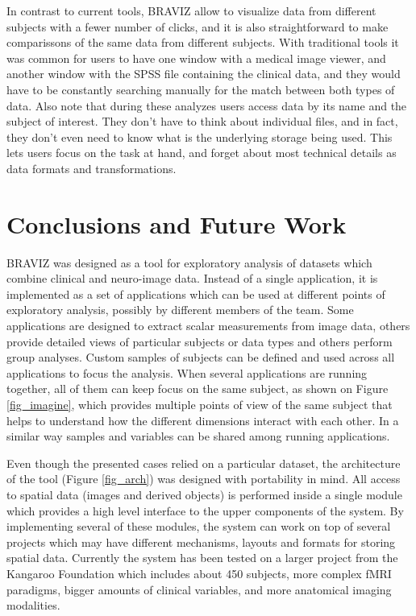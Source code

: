 \documentclass[twocolumn]{svjour3}
\begin{document}
In contrast to current tools, BRAVIZ allow to visualize data from different subjects with a fewer number of clicks, and it is also straightforward to make comparissons of the same data from different subjects. With traditional tools it was common for users to have one window with a medical image viewer, and another window with the SPSS file containing the clinical data, and they would have to be constantly searching manually for the match between both types of data. Also note that during these analyzes users access data by its name and the subject of interest. They don't have to think about individual files, and in fact, they don't even need to know what is the underlying storage being used. This lets users focus on the task at hand, and forget about most technical details as data formats and transformations. 

\section{Conclusions and Future Work}

BRAVIZ was designed as a tool for exploratory analysis of datasets which combine clinical and neuro-image data. Instead of a single application, it is implemented as a set of applications which can be used at different points of exploratory analysis, possibly by different members of the team. Some applications are designed to extract scalar measurements from image data, others provide detailed views of particular subjects or data types and others perform group analyses. Custom samples of subjects can be defined and used across all applications to focus the analysis. When several applications are running together, all of them can keep focus on the same subject, as shown on Figure \ref{fig_imagine}, which provides multiple points of view of the same subject that helps to understand how the different dimensions interact with each other. In a similar way samples and variables can be shared among running applications.

Even though the presented cases relied on a particular dataset, the architecture of the tool (Figure \ref{fig_arch}) was designed with portability in mind. All access to spatial data (images and derived objects) is performed inside a single module which provides a high level interface to the upper components of the system. By implementing several of these modules, the system can work on top of several projects which may have different mechanisms, layouts and formats for storing spatial data. Currently the system has been tested on a larger project from the Kangaroo Foundation which includes about 450 subjects, more complex fMRI paradigms, bigger amounts of clinical variables, and more anatomical imaging modalities.  
\end{document}
